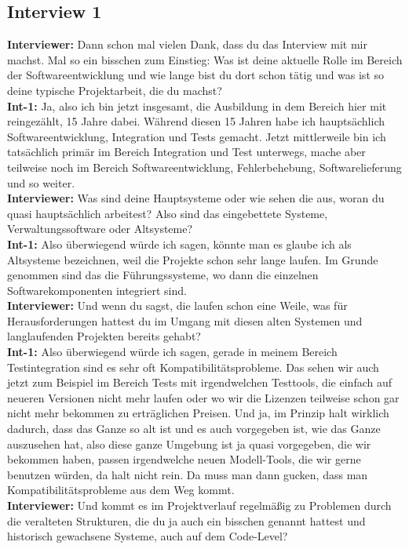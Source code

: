 \subsection*{Interview 1}

\textbf{Interviewer:} Dann schon mal vielen Dank, dass du das Interview mit mir machst. Mal so ein bisschen zum Einstieg: Was ist deine aktuelle Rolle im Bereich der Softwareentwicklung und wie lange bist du dort schon tätig und was ist so deine typische Projektarbeit, die du machst?\\
\textbf{Int-1:} Ja, also ich bin jetzt insgesamt, die Ausbildung in dem Bereich hier mit reingezählt, 15 Jahre dabei. Während diesen 15 Jahren habe ich hauptsächlich Softwareentwicklung, Integration und Tests gemacht. Jetzt mittlerweile bin ich tatsächlich primär im Bereich Integration und Test unterwegs, mache aber teilweise noch im Bereich Softwareentwicklung, Fehlerbehebung, Softwarelieferung und so weiter.\\ 
\textbf{Interviewer:} Was sind deine Hauptsysteme oder wie sehen die aus, woran du quasi hauptsächlich arbeitest? Also sind das eingebettete Systeme, Verwaltungssoftware oder Altsysteme?\\ 
\textbf{Int-1:} Also überwiegend würde ich sagen, könnte man es glaube ich als Altsysteme bezeichnen, weil die Projekte schon sehr lange laufen. Im Grunde genommen sind das die Führungssysteme, wo dann die einzelnen Softwarekomponenten integriert sind.\\ 
\textbf{Interviewer:} Und wenn du sagst, die laufen schon eine Weile, was für Herausforderungen hattest du im Umgang mit diesen alten Systemen und langlaufenden Projekten bereits gehabt?\\
\textbf{Int-1:} Also überwiegend würde ich sagen, gerade in meinem Bereich Testintegration sind es sehr oft Kompatibilitätsprobleme. Das sehen wir auch jetzt zum Beispiel im Bereich Tests mit irgendwelchen Testtools, die einfach auf neueren Versionen nicht mehr laufen oder wo wir die Lizenzen teilweise schon gar nicht mehr bekommen zu erträglichen Preisen. Und ja, im Prinzip halt wirklich dadurch, dass das Ganze so alt ist und es auch vorgegeben ist, wie das Ganze auszusehen hat, also diese ganze Umgebung ist ja quasi vorgegeben, die wir bekommen haben, passen irgendwelche neuen Modell-Tools, die wir gerne benutzen würden, da halt nicht rein. Da muss man dann gucken, dass man Kompatibilitätsprobleme aus dem Weg kommt.\\ 
\textbf{Interviewer:} Und kommt es im Projektverlauf regelmäßig zu Problemen durch die veralteten Strukturen, die du ja auch ein bisschen genannt hattest und historisch gewachsene Systeme, auch auf dem Code-Level?\\
